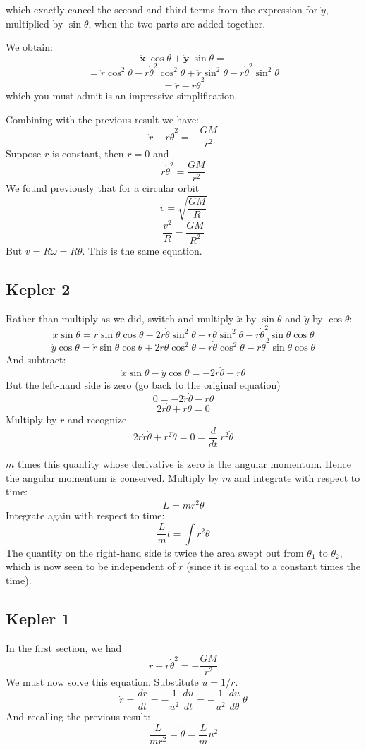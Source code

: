 \documentclass[11pt, oneside]{article}
\begin{document}
which exactly cancel the second and third terms from the expression for $\ddot{y}$, multiplied by $\sin \theta$, when the two parts are added together.  

We obtain:
\[ \ddot{\mathbf{x}} \ \cos \theta + \ddot{\mathbf{y}} \ \sin \theta = \]
\[ = \ddot{r} \cos^2 \theta - r \dot{\theta}^2 \cos^2 \theta +  \ddot{r} \sin^2 \theta - r \dot{\theta}^2 \sin^2 \theta  \]
\[ = \ddot{r}  - r \dot{\theta}^2 \]
which you must admit is an impressive simplification.  

Combining with the previous result we have:
\[  \ddot{r}  - r \dot{\theta}^2 = - \frac{GM}{r^2} \]
Suppose $r$ is constant, then  $\ddot{r} = 0$ and
\[ r \dot{\theta}^2 = \frac{GM}{r^2} \]
We found previously that for a circular orbit
\[ v = \sqrt{\frac{GM}{R}} \]
\[ \frac{v^2}{R} = \frac{GM}{R^2} \]
But $v = R\omega = R \dot{\theta}$.  This is the same equation.

\subsection*{Kepler 2}
Rather than multiply as we did, switch and multiply $\ddot{x}$ by $\sin \theta$ and $\ddot{y}$ by $\cos \theta$:
\[ \ddot{x} \sin \theta = \ddot{r} \sin \theta \cos \theta - 2 \dot{r}  \dot{\theta} \sin^2 \theta - r \ddot{\theta} \sin^2 \theta - r \dot{\theta}^2 \sin \theta \cos \theta \]
\[ \ddot{y} \cos \theta = \ddot{r} \sin \theta \cos \theta + 2 \dot{r} \dot{\theta} \cos^2 \theta + r \ddot{\theta} \cos^2 \theta - r \dot{\theta}^2 \sin \theta \cos \theta  \]
And subtract:
\[ \ddot{x} \sin \theta - \ddot{y} \cos \theta = - 2 \dot{r}  \dot{\theta} - r \ddot{\theta} \]
But the left-hand side is zero (go back to the original equation)
\[ 0 = - 2 \dot{r}  \dot{\theta} - r \ddot{\theta} \]
\[ 2 \dot{r}  \dot{\theta} + r \ddot{\theta} = 0 \]
Multiply by $r$ and recognize
\[ 2 r \dot{r}  \dot{\theta} + r^2 \ddot{\theta} = 0 = \frac{d}{dt} \ r^2 \dot{\theta} \]

$m$ times this quantity whose derivative is zero is the angular momentum.  Hence the angular momentum is conserved.  Multiply by $m$ and integrate with respect to time:
\[ L = mr^2 \dot{\theta} \]
Integrate again with respect to time:
\[ \frac{L}{m} t = \int r^2 \theta \]
The quantity on the right-hand side is twice the area swept out from $\theta_1$ to $\theta_2$, which is now seen to be independent of $r$ (since it is equal to a constant times the time).

\subsection*{Kepler 1}
In the first section, we had
\[  \ddot{r}  - r \dot{\theta}^2 = - \frac{GM}{r^2} \]
We must now solve this equation.  Substitute $u = 1/r$.
\[ \dot{r} = \frac{dr}{dt} = -\frac{1}{u^2} \ \frac{du}{dt} = -\frac{1}{u^2} \ \frac{du}{d \theta} \ \dot{\theta}  \]
And recalling the previous result:
\[ \frac{L}{mr^2} = \dot{\theta} = \frac{L}{m}u^2 \]
\end{document}

